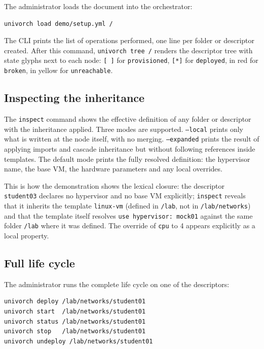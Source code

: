 The administrator loads the document into the orchestrator:

\begin{verbatim}
univorch load demo/setup.yml /
\end{verbatim}

The CLI prints the list of operations performed, one line per
folder or descriptor created. After this command, \texttt{univorch
tree /} renders the descriptor tree with state glyphs next to each
node: \texttt{[ ]} for \texttt{provisioned}, \texttt{[*]} for
\texttt{deployed}, in red for \texttt{broken}, in yellow for
\texttt{unreachable}.

\subsection{Inspecting the inheritance}

The \texttt{inspect} command shows the effective definition of any
folder or descriptor with the inheritance applied. Three modes are
supported. \texttt{--local} prints only what is written at the node
itself, with no merging. \texttt{--expanded} prints the result of
applying imports and cascade inheritance but without following
references inside templates. The default mode prints the fully
resolved definition: the hypervisor name, the base VM, the hardware
parameters and any local overrides.

This is how the demonstration shows the lexical closure: the
descriptor \texttt{student03} declares no hypervisor and no base VM
explicitly; \texttt{inspect} reveals that it inherits the template
\texttt{linux-vm} (defined in \texttt{/lab}, not in
\texttt{/lab/networks}) and that the template itself resolves
\texttt{use hypervisor: mock01} against the same folder
\texttt{/lab} where it was defined. The override of \texttt{cpu} to
4 appears explicitly as a local property.

\subsection{Full life cycle}

The administrator runs the complete life cycle on one of the
descriptors:

\begin{verbatim}
univorch deploy /lab/networks/student01
univorch start  /lab/networks/student01
univorch status /lab/networks/student01
univorch stop   /lab/networks/student01
univorch undeploy /lab/networks/student01
\end{verbatim}

